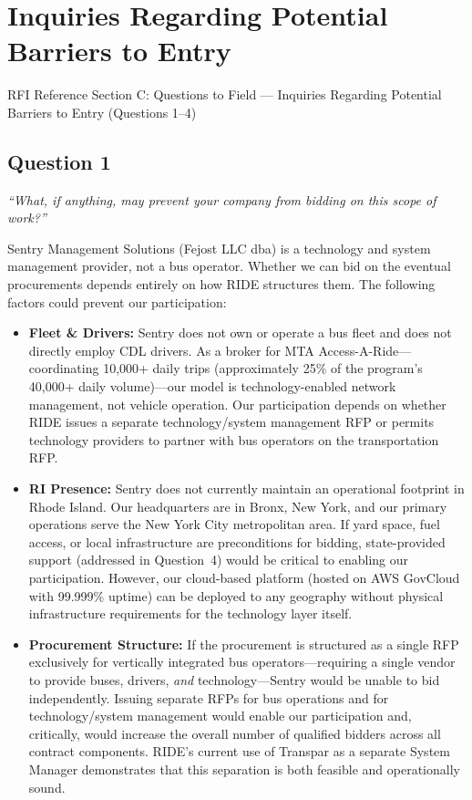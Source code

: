 \section{\texorpdfstring{\color{MidnightBlue}Inquiries Regarding Potential Barriers to Entry}{Barriers to Entry}}

\begin{sidebar}{RFI Reference}
Section C: Questions to Field --- Inquiries Regarding Potential Barriers to Entry (Questions 1--4)
\end{sidebar}

\subsection{Question 1}
\textit{``What, if anything, may prevent your company from bidding on this scope of work?''}

Sentry Management Solutions (Fejost LLC dba) is a technology and system management provider, not a bus operator. Whether we can bid on the eventual procurements depends entirely on how RIDE structures them. The following factors could prevent our participation:

\begin{itemize}
    \item \textbf{Fleet \& Drivers:} Sentry does not own or operate a bus fleet and does not directly employ CDL drivers. As a broker for MTA Access-A-Ride---coordinating 10,000+ daily trips (approximately 25\% of the program's 40,000+ daily volume)---our model is technology-enabled network management, not vehicle operation. Our participation depends on whether RIDE issues a separate technology/system management RFP or permits technology providers to partner with bus operators on the transportation RFP.
    \item \textbf{RI Presence:} Sentry does not currently maintain an operational footprint in Rhode Island. Our headquarters are in Bronx, New York, and our primary operations serve the New York City metropolitan area. If yard space, fuel access, or local infrastructure are preconditions for bidding, state-provided support (addressed in Question~4) would be critical to enabling our participation. However, our cloud-based platform (hosted on AWS GovCloud with 99.999\% uptime) can be deployed to any geography without physical infrastructure requirements for the technology layer itself.
    \item \textbf{Procurement Structure:} If the procurement is structured as a single RFP exclusively for vertically integrated bus operators---requiring a single vendor to provide buses, drivers, \textit{and} technology---Sentry would be unable to bid independently. Issuing separate RFPs for bus operations and for technology/system management would enable our participation and, critically, would increase the overall number of qualified bidders across all contract components. RIDE's current use of Transpar as a separate System Manager demonstrates that this separation is both feasible and operationally sound.
\end{itemize}

